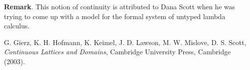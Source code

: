 \documentclass[12pt]{article}
\begin{document}
\textbf{Remark}.  This notion of continuity is attributed to Dana Scott when he was trying to come up with a model for the formal system of untyped lambda calculus.

\begin{thebibliography}{8}
 G. Gierz, K. H. Hofmann, K. Keimel, J. D. Lawson, M. W. Mislove, D. S. Scott, {\em Continuous Lattices and Domains}, Cambridge University Press, Cambridge (2003).
\end{thebibliography}
\end{document}

